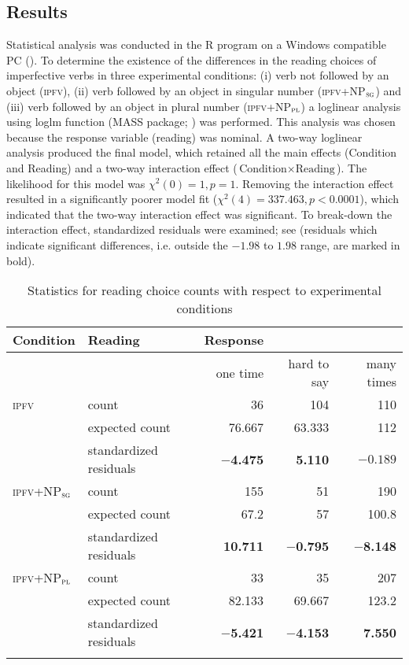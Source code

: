 \documentclass[output=paper]{langscibook}
\begin{document}
\subsection{Results}\label{jan-bla:fansb:kb:sec3.2}

Statistical analysis was conducted in the R program on a Windows compatible PC (\citealt{RDevelopmentCoreTeam2019}). To determine the existence of the differences in the reading choices of imperfective verbs in three experimental conditions: (i) verb not followed by an object (\textsc{ipfv}), (ii) verb followed by an object in singular number (\textsc{ipfv}+NP$_\textsc{sg}$) and (iii) verb followed by an object in plural number (\textsc{ipfv}+NP$_\textsc{pl}$) a loglinear analysis using loglm function (MASS package; \citealt{VenablesRipley2002}) was performed. This analysis was chosen because the response variable (reading) was nominal. A two-way loglinear analysis produced the final model, which retained all the main effects (Condition and Reading) and a two-way interaction effect ($\text{Condition}\times\text{Reading}$). The likelihood for this model was $\chi^2(0) = 1, p =1$. Removing the interaction effect resulted in a significantly poorer model fit ($\chi^2(4) = 337.463, p < 0.0001$), which indicated that the two-way interaction effect was significant. To break-down the interaction effect, standardized residuals were examined; see  (residuals which indicate significant differences, i.e. outside the $-1.98$ to $1.98$ range, are marked in bold). 

\begin{table}
\caption{Statistics for reading choice counts with respect to experimental conditions}
\label{jan-bla:fansb:kb:tab3}
 \begin{tabularx}{\textwidth}{lQrrr}
  \lsptoprule
  Condition & Reading&Response\\
  \midrule
     & & one time & hard to say & many times\\\tablevspace
    \textsc{ipfv} & count & 36 & 104 & 110\\
    & expected count &	76.667 & 63.333	& 112\\
    & standardized residuals & $-$\textbf{4.475} & \textbf{5.110} & $-0.189$\\\tablevspace
    \textsc{ipfv}+NP$_\textsc{sg}$ & count & 155	& 51 & 190\\
    & expected count &	67.2 &	57 & 100.8\\
    & standardized residuals & \textbf{10.711} & $-$\textbf{0.795} & $-$\textbf{8.148}\\\tablevspace
    \textsc{ipfv}+NP$_\textsc{pl}$ & count & 33 & 35 & 207\\
    & expected count &	82.133 & 69.667 & 123.2\\
    & standardized residuals & $-$\textbf{5.421} & $-$\textbf{4.153} & \textbf{7.550}\\
  \lspbottomrule
 \end{tabularx}
\end{table}
\end{document}
